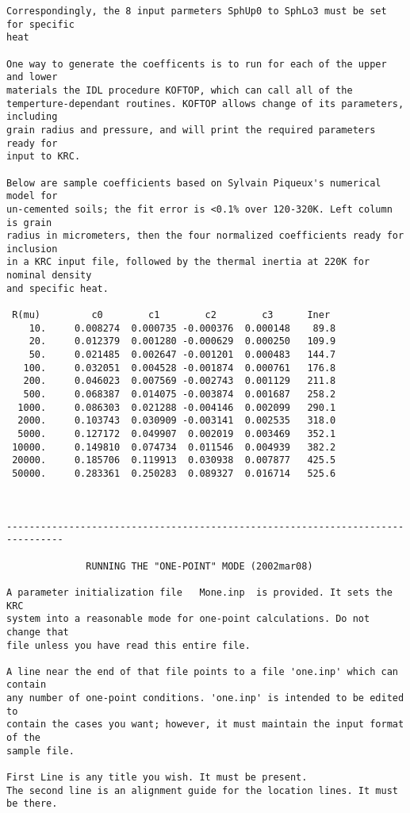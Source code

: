 \begin{verbatim}
Correspondingly, the 8 input parmeters SphUp0 to SphLo3 must be set for specific
heat
 
One way to generate the coefficents is to run for each of the upper and lower
materials the IDL procedure KOFTOP, which can call all of the
temperture-dependant routines. KOFTOP allows change of its parameters, including
grain radius and pressure, and will print the required parameters ready for
input to KRC.

Below are sample coefficients based on Sylvain Piqueux's numerical model for
un-cemented soils; the fit error is <0.1% over 120-320K. Left column is grain
radius in micrometers, then the four normalized coefficients ready for inclusion
in a KRC input file, followed by the thermal inertia at 220K for nominal density
and specific heat.

 R(mu)         c0        c1        c2        c3      Iner  
    10.     0.008274  0.000735 -0.000376  0.000148    89.8 
    20.     0.012379  0.001280 -0.000629  0.000250   109.9 
    50.     0.021485  0.002647 -0.001201  0.000483   144.7 
   100.     0.032051  0.004528 -0.001874  0.000761   176.8 
   200.     0.046023  0.007569 -0.002743  0.001129   211.8 
   500.     0.068387  0.014075 -0.003874  0.001687   258.2 
  1000.     0.086303  0.021288 -0.004146  0.002099   290.1 
  2000.     0.103743  0.030909 -0.003141  0.002535   318.0 
  5000.     0.127172  0.049907  0.002019  0.003469   352.1 
 10000.     0.149810  0.074734  0.011546  0.004939   382.2 
 20000.     0.185706  0.119913  0.030938  0.007877   425.5 
 50000.     0.283361  0.250283  0.089327  0.016714   525.6 



--------------------------------------------------------------------------------

              RUNNING THE "ONE-POINT" MODE (2002mar08)

A parameter initialization file   Mone.inp  is provided. It sets the KRC 
system into a reasonable mode for one-point calculations. Do not change that 
file unless you have read this entire file.

A line near the end of that file points to a file 'one.inp' which can contain
any number of one-point conditions. 'one.inp' is intended to be edited to
contain the cases you want; however, it must maintain the input format of the
sample file.

First Line is any title you wish. It must be present.
The second line is an alignment guide for the location lines. It must be there.


\end{verbatim}

